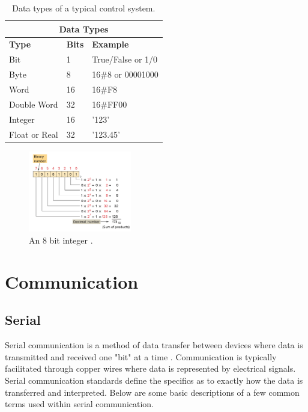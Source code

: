     \begin{table}
    \centering
    \caption{Data types of a typical control system.}
        \begin{tabular}{ |p{3cm}|p{2cm}|p{3cm}|  }
                \hline
                \multicolumn{3}{|c|}{\textbf{Data Types}} \\
                \hline
                \textbf{Type}& \textbf{Bits}& \textbf{Example} \\
                \hline
                Bit & 1 & True/False or 1/0 \\
                Byte & 8 & 16\#8 or 00001000 \\
                Word & 16 & 16\#F8 \\
                Double Word & 32 & 16\#FF00 \\
                Integer & 16 & '123' \\
                Float or Real & 32 & '123.45'\\
                \hline
        \end{tabular}
        \label{table:dataTypes}   
        
    \end{table}
    

        \begin{figure}[H]
            \centering
            \includegraphics[width = 0.4\textwidth]{2_images/int.png}
            \caption{An 8 bit integer \cite{petruzella2017programmable}.}
            \label{fig:int}
        \end{figure}         

\section{Communication}

\subsection{Serial}
    Serial communication is a method of data transfer between devices where data is transmitted and received one "bit" at a time \cite{frenzel2015handbook}. Communication is typically facilitated through copper wires where data is represented by electrical signals. Serial communication standards define the specifics as to exactly how the data is transferred and interpreted. Below are some basic descriptions of a few common terms used within serial communication.
    
